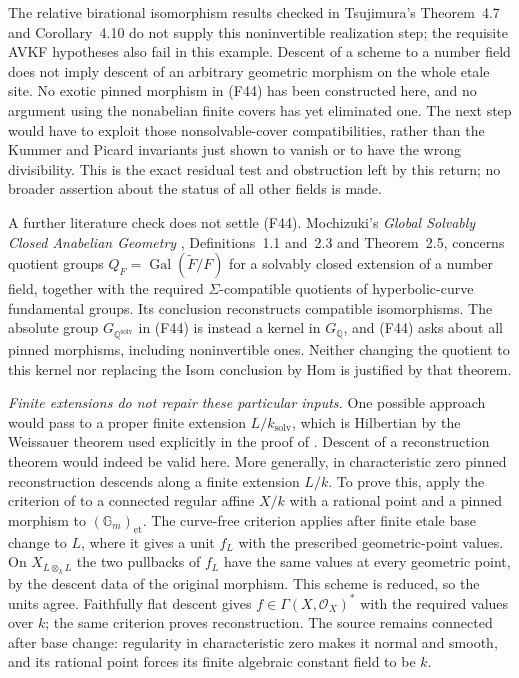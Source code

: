 The relative birational isomorphism results checked in
Tsujimura's Theorem~4.7 and Corollary~4.10 \cite{Tsujimura2022}
do not supply this noninvertible realization step; the requisite
AVKF hypotheses also fail in this example. Descent of a scheme to
a number field does not imply descent of an arbitrary geometric
morphism on the whole etale site. No exotic pinned morphism in
(F44) has been constructed here, and no argument using the
nonabelian finite covers has yet eliminated one. The next step
would have to exploit those nonsolvable-cover compatibilities,
rather than the Kummer and Picard invariants just shown to vanish
or to have the wrong divisibility. This is the exact residual
test and obstruction left by this return; no broader assertion
about the status of all other fields is made.

A further literature check does not settle (F44).
Mochizuki's \emph{Global Solvably Closed Anabelian Geometry}
\cite{Mochizuki2006SolvablyClosed}, Definitions~1.1 and~2.3 and
Theorem~2.5, concerns quotient groups
$Q_F=\operatorname{Gal}(\widetilde F/F)$ for a solvably closed
extension of a number field, together with the required
$\Sigma$-compatible quotients of hyperbolic-curve fundamental
groups. Its conclusion reconstructs compatible isomorphisms.
The absolute group $G_{\mathbb Q^{\mathrm{solv}}}$ in (F44)
is instead a kernel in $G_{\mathbb Q}$, and (F44) asks about
all pinned morphisms, including noninvertible ones. Neither
changing the quotient to this kernel nor replacing the Isom
conclusion by Hom is justified by that theorem.

\medskip
\noindent\emph{Finite extensions do not repair these particular inputs.}
One possible approach would pass to a proper finite extension
$L/k_{\mathrm{solv}}$, which is Hilbertian by the Weissauer theorem
used explicitly in the proof of \cite[Proposition~2.5]{F44Jarden2011}.
Descent of a reconstruction theorem would indeed be valid here.
More generally, in characteristic zero pinned reconstruction
descends along a finite extension $L/k$. To prove this, apply the
criterion of \cite[Theorem~4.18]{CHW2024} to a connected regular
affine $X/k$ with a rational point and a pinned morphism to
$(\mathbb G_m)_{\mathrm{et}}$. The curve-free criterion applies
after finite etale base change to $L$, where it gives a unit
$f_L$ with the prescribed geometric-point values. On
$X_{L\otimes_kL}$ the two pullbacks of $f_L$ have the same values
at every geometric point, by the descent data of the original
morphism. This scheme is reduced, so the units agree.
Faithfully flat descent gives $f\in\Gamma(X,\mathcal O_X)^*$
with the required values over $k$; the same criterion proves
reconstruction. The source remains connected after base change:
regularity in characteristic zero makes it normal and smooth,
and its rational point forces its finite algebraic constant field
to be $k$.

